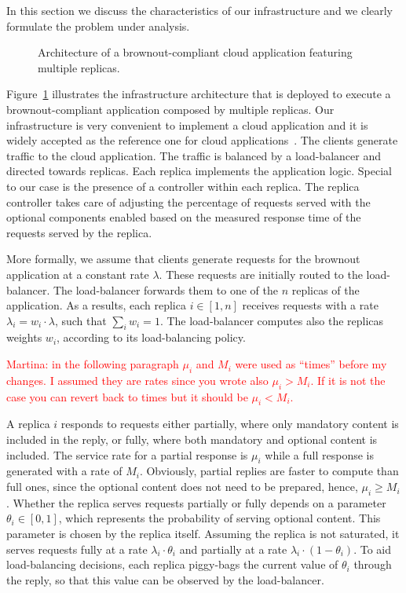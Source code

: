 In this section we discuss the characteristics of our infrastructure
and we clearly formulate the problem under analysis.

\begin{figure}[t]
  \centering 
   
  \caption{Architecture of a brownout-compliant cloud application
    featuring multiple replicas.}
  \label{fig:architecture}
\end{figure}

Figure~\ref{fig:architecture} illustrates the infrastructure
architecture that is deployed to execute a brownout-compliant
application composed by multiple replicas. Our infrastructure is very
convenient to implement a cloud application and it is widely accepted
as the reference one for cloud applications~\citep{Barroso09}. The
clients generate traffic to the cloud application. The traffic is
balanced by a load-balancer and directed towards replicas. Each
replica implements the application logic. Special to our case is the
presence of a controller within each replica. The replica controller
takes care of adjusting the percentage of requests served with the
optional components enabled based on the measured response time of the
requests served by the replica.

More formally, we assume that clients generate requests for the
brownout application at a constant rate $\lambda$. These requests are
initially routed to the load-balancer. The load-balancer forwards them
to one of the $n$ replicas of the application. As a results, each
replica $i \in [1,n]$ receives requests with a rate $\lambda_i = w_i
\cdot \lambda$, such that $\sum_{i} w_i = 1$. The load-balancer
computes also the replicas weights $w_i$, according to its
load-balancing policy.

\textcolor{red}{Martina: in the following paragraph $\mu_i$ and $M_i$
  were used as ``times'' before my changes. I assumed they are rates
  since you wrote also $\mu_i > M_i$. If it is not the case you can
  revert back to times but it should be $\mu_i < M_i$.}

A replica $i$ responds to requests either partially, where only
mandatory content is included in the reply, or fully, where both
mandatory and optional content is included. The service rate for a
partial response is $\mu_i$ while a full response is generated with a
rate of $M_i$. Obviously, partial replies are faster to compute than
full ones, since the optional content does not need to be prepared,
hence, $\mu_i \geq M_i$. Whether the replica serves requests partially
or fully depends on a parameter $\theta_i \in [0, 1]$, which
represents the probability of serving optional content. This parameter
is chosen by the replica itself. Assuming the replica is not
saturated, it serves requests fully at a rate $\lambda_i \cdot
\theta_i$ and partially at a rate $\lambda_i \cdot (1-\theta_i)$. To
aid load-balancing decisions, each replica piggy-bags the current
value of $\theta_i$ through the reply, so that this value can be
observed by the load-balancer.

